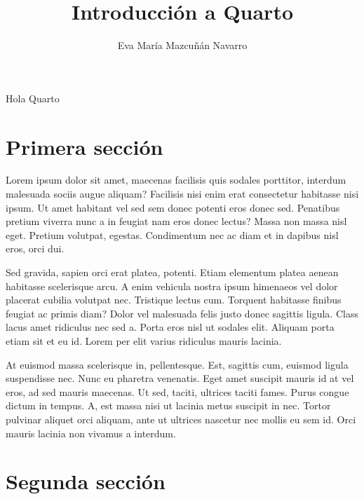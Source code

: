 \documentclass[
  letterpaper,
  DIV=11,
  numbers=noendperiod]{scrartcl}
\title{Introducción a Quarto}
\author{Eva María Mazcuñán Navarro}
\date{}
\renewcommand*\contentsname{Table of contents}
\newcommand\contentsname{Table of contents}
\begin{document}
\maketitle
\ifdefined\Shaded\renewenvironment{Shaded}{\begin{tcolorbox}[boxrule=0pt, breakable, sharp corners, frame hidden, interior hidden, borderline west={3pt}{0pt}{shadecolor}, enhanced]}{\end{tcolorbox}}\fi

\renewcommand*\contentsname{Table of contents}
{
\hypersetup{linkcolor=}
\setcounter{tocdepth}{3}
\tableofcontents
}
Hola Quarto

\hypertarget{primera-secciuxf3n}{%
\section{Primera sección}\label{primera-secciuxf3n}}

Lorem ipsum dolor sit amet, maecenas facilisis quis sodales porttitor,
interdum malesuada sociis augue aliquam? Facilisis nisi enim erat
consectetur habitasse nisi ipsum. Ut amet habitant vel sed sem donec
potenti eros donec sed. Penatibus pretium viverra nunc a in feugiat nam
eros donec lectus? Massa non massa nisl eget. Pretium volutpat, egestas.
Condimentum nec ac diam et in dapibus nisl eros, orci dui.

Sed gravida, sapien orci erat platea, potenti. Etiam elementum platea
aenean habitasse scelerisque arcu. A enim vehicula nostra ipsum
himenaeos vel dolor placerat cubilia volutpat nec. Tristique lectus cum.
Torquent habitasse finibus feugiat ac primis diam? Dolor vel malesuada
felis justo donec sagittis ligula. Class lacus amet ridiculus nec sed a.
Porta eros nisl ut sodales elit. Aliquam porta etiam sit et eu id. Lorem
per elit varius ridiculus mauris lacinia.

At euismod massa scelerisque in, pellentesque. Est, sagittis cum,
euismod ligula suspendisse nec. Nunc eu pharetra venenatis. Eget amet
suscipit mauris id at vel eros, ad sed mauris maecenas. Ut sed, taciti,
ultrices taciti fames. Purus congue dictum in tempus. A, est massa nisi
ut lacinia metus suscipit in nec. Tortor pulvinar aliquet orci aliquam,
ante ut ultrices nascetur nec mollis eu sem id. Orci mauris lacinia non
vivamus a interdum.

\hypertarget{segunda-secciuxf3n}{%
\section{Segunda sección}\label{segunda-secciuxf3n}}
\end{document}
